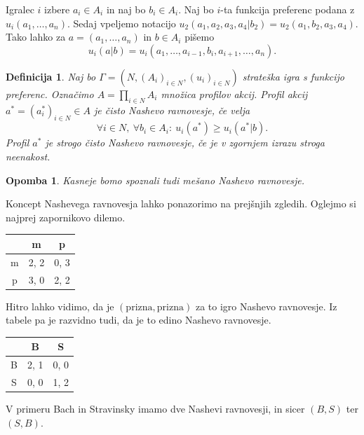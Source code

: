 \documentclass[10pt, a4paper]{article}
\newtheorem{defi}[izr]{Definicija}
\newenvironment{noticeB}{%
  \tcolorbox[%
  notitle,
  empty,
  enhanced,  %
  breakable,
  coltext=black,
  colback=white, 
  fontupper=\rmfamily,
  parbox=false,
  noparskip,
  sharp corners,
  boxrule=-1pt,  %
  frame hidden,
  left=7pt,  %
  right=7pt,
  top=5pt,
  bottom=5pt,
  before skip=2.5ex plus 2pt,
  after skip=2.5ex plus 2pt,
  borderline west = {1.5pt}{-0.1pt}{blue!30!black}, %
  overlay unbroken and last={%
    \draw[color=black, line width=1.25pt]
    ($(frame.south west)+(1.pt, -0.1pt)$) -- ++(2em, 0);
  }
  ]}
{\endtcolorbox}
\newenvironment{definicija}{\begin{defi}\begin{noticeB}}{%
    \end{noticeB}\end{defi}}
\newtheorem*{opomba}{Opomba}
\begin{document}
Igralec $i$ izbere $a_i \in A_i$ in naj bo $b_i \in A_i$. Naj bo $i$-ta funkcija preferenc podana z $u_i (a_1, \dots, a_n)$.
Sedaj vpeljemo notacijo $u_2 (a_1, a_2, a_3, a_4 | b_2) = u_2 (a_1, b_2, a_3, a_4)$.
Tako lahko za $a = (a_1, \dots, a_n)$ in $b \in A_i$ pišemo $$u_i (a | b) = u_i (a_1, \dots, a_{i - 1}, b_i, a_{i + 1}, \dots, a_n).$$

\begin{definicija}
    Naj bo $\Gamma = (N, (A_i)_{i \in N}, (u_i)_{i \in N})$
    strateška igra s funkcijo preferenc. Označimo $A = \prod_{i \in N}A_i$
    množica profilov akcij. Profil akcij $a^* = (a_i ^*)_{i \in N} \in A$
    je čisto Nashevo ravnovesje, če velja 
    $$\forall i \in N,\ \forall b_i \in A_i:\ u_i (a^*) \geq u_i (a^* | b).$$
    Profil $a^*$ je strogo čisto Nashevo ravnovesje, če je v zgornjem izrazu stroga neenakost.
\end{definicija}

\begin{opomba}
    Kasneje bomo spoznali tudi mešano Nashevo ravnovesje.
\end{opomba}

Koncept Nashevega ravnovesja lahko ponazorimo na prejšnjih zgledih.
Oglejmo si najprej zapornikovo dilemo.

\begin{center}
    {\begin{tabular}{c|c|c|}
        & m & p\\
        \hline
        m & 2, 2 & 0, 3\\
        \hline
        p & 3, 0 & 2, 2\\
        \hline
    \end{tabular}}        
\end{center}

Hitro lahko vidimo, da je $(\mathrm{prizna}, \mathrm{prizna})$ za to igro Nashevo ravnovesje.
Iz tabele pa je razvidno tudi, da je to edino Nashevo ravnovesje.

\begin{center}
    {\begin{tabular}{c|c|c|}
        & B & S\\
        \hline
        B & 2, 1 & 0, 0\\
        \hline
        S & 0, 0 & 1, 2\\
        \hline
    \end{tabular}}        
\end{center}

V primeru Bach in Stravinsky imamo dve Nashevi ravnovesji, in sicer $(B, S)$ ter $(S, B)$.
\end{document}
